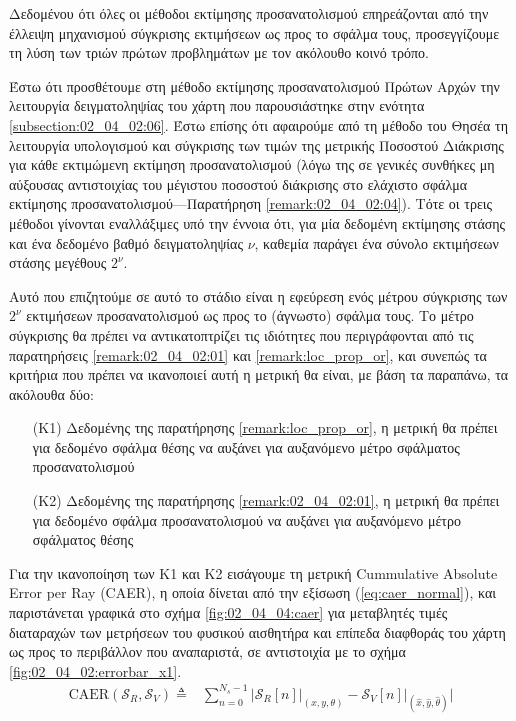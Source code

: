 Δεδομένου ότι όλες οι μέθοδοι εκτίμησης προσανατολισμού επηρεάζονται από την
έλλειψη μηχανισμού σύγκρισης εκτιμήσεων ως προς το σφάλμα τους, προσεγγίζουμε
τη λύση των τριών πρώτων προβλημάτων με τον ακόλουθο κοινό τρόπο.

Έστω ότι προσθέτουμε στη μέθοδο εκτίμησης προσανατολισμού Πρώτων Αρχών την
λειτουργία δειγματοληψίας του χάρτη που παρουσιάστηκε στην ενότητα
\ref{subsection:02_04_02:06}. Έστω επίσης ότι αφαιρούμε από τη μέθοδο του Θησέα
τη λειτουργία υπολογισμού και σύγκρισης των τιμών της μετρικής Ποσοστού
Διάκρισης για κάθε εκτιμώμενη εκτίμηση προσανατολισμού (λόγω της σε γενικές
συνθήκες μη αύξουσας αντιστοιχίας του μέγιστου ποσοστού διάκρισης στο ελάχιστο
σφάλμα εκτίμησης προσανατολισμού---Παρατήρηση \ref{remark:02_04_02:04}). Τότε
οι τρεις μέθοδοι γίνονται εναλλάξιμες υπό την έννοια ότι, για μία δεδομένη
εκτίμησης στάσης και ένα δεδομένο βαθμό δειγματοληψίας $\nu$, καθεμία παράγει
ένα σύνολο εκτιμήσεων στάσης μεγέθους $2^\nu$.

Αυτό που επιζητούμε σε αυτό το στάδιο είναι η εφεύρεση ενός μέτρου σύγκρισης
των $2^\nu$ εκτιμήσεων προσανατολισμού ως προς το (άγνωστο) σφάλμα τους. Το
μέτρο σύγκρισης θα πρέπει να αντικατοπτρίζει τις ιδιότητες που περιγράφονται
από τις παρατηρήσεις \ref{remark:02_04_02:01} και \ref{remark:loc_prop_or},
και συνεπώς τα κριτήρια που πρέπει να ικανοποιεί αυτή η μετρική θα είναι, με
βάση τα παραπάνω, τα ακόλουθα δύο:

\begin{itemize}
  \item[(K1)] Δεδομένης της παρατήρησης \ref{remark:loc_prop_or}, η μετρική θα
        πρέπει για δεδομένο σφάλμα θέσης να αυξάνει για αυξανόμενο μέτρο
        σφάλματος προσανατολισμού
  \item[(K2)] Δεδομένης της παρατήρησης \ref{remark:02_04_02:01}, η μετρική θα
        πρέπει για δεδομένο σφάλμα προσανατολισμού να αυξάνει για αυξανόμενο
        μέτρο σφάλματος θέσης
\end{itemize}

Για την ικανοποίηση των Κ1 και Κ2 εισάγουμε τη μετρική Cummulative Absolute
Error per Ray (CAER), η οποία δίνεται από την εξίσωση (\ref{eq:caer_normal}),
και παριστάνεται γραφικά στο σχήμα \ref{fig:02_04_04:caer} για μεταβλητές τιμές
διαταραχών των μετρήσεων του φυσικού αισθητήρα και επίπεδα διαφθοράς του χάρτη
ως προς το περιβάλλον που αναπαριστά, σε αντιστοιχία με το σχήμα
\ref{fig:02_04_02:errorbar_x1}.
\begin{align}
  \text{CAER}(\mathcal{S}_R, \mathcal{S}_V) \triangleq & \sum\limits_{n=0}^{N_s-1} \Bigg|
    \mathcal{S}_R[n]\Big|_{(x, y, \theta)} -
    \mathcal{S}_V[n]\Big|_{(\hat{x}, \hat{y}, \hat{\theta})} \Bigg|
  \label{eq:caer_normal}
\end{align}

